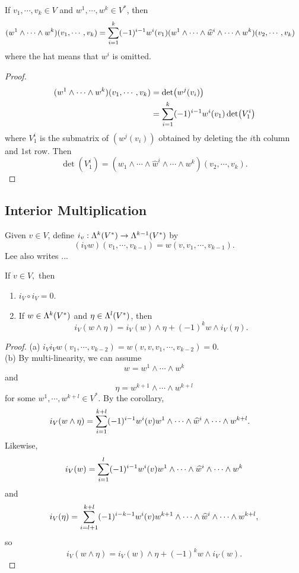 \begin{corollary}
    If $v_1,\cdots,v_k \in V$ and $w^1,\cdots,w^k \in V^*$, then 
    \begin{align*}
    (w^1 \wedge \cdots \wedge w^k)(v_1,\cdots,v_k)
    &= \sum_{i=1}^{k}(-1)^{i-1}w^i(v_1)(w^1 \wedge \cdots \wedge \widehat{w}^i \wedge \cdots \wedge w^k)(v_2,\cdots,v_k)
    \end{align*}
    where the hat means that $w^i$ is omitted. 
\end{corollary}
\begin{proof}
    \begin{align*}
    (w^1 \wedge \cdots \wedge w^k)(v_1,\cdots,v_k)
    &= \det(w^j(v_i)) \\
    &= \sum_{i=1}^{k}(-1)^{i-1}w^i(v_1) \det (V_1^i)
    \end{align*}
    where $V_1^i$ is the submatrix of $(w^j(v_i))$ obtained by deleting the $i$th column and $1$st row. Then 
    $$\det(V_1^i) = (w_1 \wedge \cdots \wedge \hat{w}^i \wedge \cdots \wedge w^k)(v_2,\cdots,v_k).$$
\end{proof}
\subsection{Interior Multiplication}
Given $v \in V$, define $i_v:\Lambda^k(V^*) \to \Lambda^{k-1}(V^*)$ by 
$$(i_V w)(v_1,\cdots,v_{k-1}) = w(v,v_1,\cdots,v_{k-1}).$$ Lee also writes ...

\begin{lemma}\label{14.13}
    If $v \in V,$ then 
    \begin{enumerate}
    \item[(a)] $i_V \circ i_V = 0$.
    \item[(b)] If $w \in \Lambda^k(V^*)$ and $\eta \in \Lambda^l(V^*)$, then 
    $$i_V(w \wedge \eta) = i_V(w) \wedge \eta + (-1)^k w \wedge i_V(\eta). $$
    \end{enumerate}
\end{lemma}
\begin{proof}
    (a) $i_V i_V w(v_1,\cdots,v_{k-2}) = w(v,v,v_1,\cdots,v_{k-2})=0$. \\
    (b) By multi-linearity, we can assume 
    $$w = w^1 \wedge \cdots \wedge w^k$$ and 
    $$\eta = w^{k+1} \wedge \cdots \wedge w^{k+l}$$
    for some $w^1,\cdots,w^{k+l} \in V^*$. By the corollary, 
    \begin{align*}
    i_V(w \wedge \eta) &= \sum_{i=1}^{k+l}(-1)^{i-1}w^i(v) w^1 \wedge \cdots \wedge \widehat{w}^i \wedge \cdots \wedge w^{k+l}.
    \end{align*}
    Likewise,
    $$
    i_V(w) = \sum_{i=1}^{l}(-1)^{i-1}w^i(v) w^1 \wedge \cdots \wedge \widehat{w}^i \wedge \cdots \wedge w^{k}$$ and 
    $$
    i_V(\eta) = \sum_{i=l+1}^{k+l}(-1)^{i-k-1}
    w^i(v) w^{k+1} \wedge \cdots \wedge \widehat{w}^i \wedge \cdots \wedge w^{k+l},$$
    so 
    $$i_V(w \wedge \eta) = i_V(w) \wedge \eta + (-1)^k w \wedge i_V(w). $$
\end{proof}


